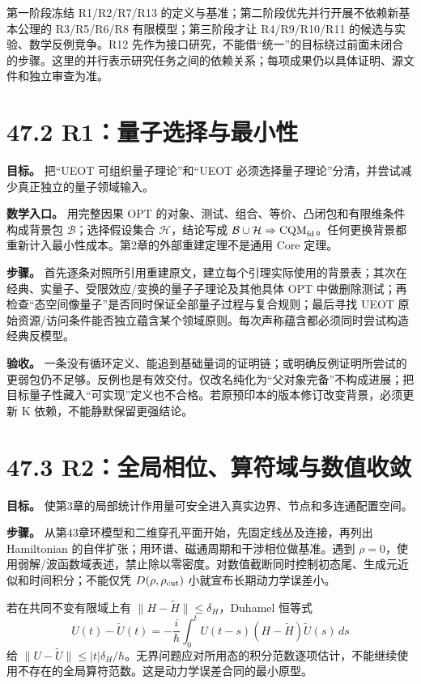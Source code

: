 \documentclass[
  11pt,
  oneside]{book}
\begin{document}
第一阶段冻结 R1/R2/R7/R13
的定义与基准；第二阶段优先并行开展不依赖新基本公理的 R3/R5/R6/R8
有限模型；第三阶段才让 R4/R9/R10/R11 的候选与实验、数学反例竞争。R12
先作为接口研究，不能借``统一''的目标绕过前面未闭合的步骤。这里的并行表示研究任务之间的依赖关系；每项成果仍以具体证明、源文件和独立审查为准。

\section{47.2 R1：量子选择与最小性}

\textbf{目标。} 把``UEOT 可组织量子理论''和``UEOT
必须选择量子理论''分清，并尝试减少真正独立的量子领域输入。

\textbf{数学入口。} 用完整因果 OPT
的对象、测试、组合、等价、凸闭包和有限维条件构成背景包
\(\mathcal B\)；选择假设集合 \(\mathcal H\)，结论写成
\(\mathcal B\cup\mathcal H\Rightarrow\mathrm{CQM}_{\rm fd}\)。任何更换背景都重新计入最小性成本。第2章的外部重建定理不是通用
Core 定理。

\textbf{步骤。}
首先逐条对照所引用重建原文，建立每个引理实际使用的背景表；其次在经典、实量子、受限效应/变换的量子子理论及其他具体
OPT
中做删除测试；再检查``态空间像量子''是否同时保证全部量子过程与复合规则；最后寻找
UEOT
原始资源/访问条件能否独立蕴含某个领域原则。每次声称蕴含都必须同时尝试构造经典反模型。

\textbf{验收。}
一条没有循环定义、能追到基础量词的证明链；或明确反例证明所尝试的更弱包仍不足够。反例也是有效交付。仅改名纯化为``父对象完备''不构成进展；把目标量子性藏入``可实现''定义也不合格。若原预印本的版本修订改变背景，必须更新
K 依赖，不能静默保留更强结论。

\section{47.3 R2：全局相位、算符域与数值收敛}

\textbf{目标。}
使第3章的局部统计作用量可安全进入真实边界、节点和多连通配置空间。

\textbf{步骤。}
从第43章环模型和二维穿孔平面开始，先固定线丛及连接，再列出 Hamiltonian
的自伴扩张；用环谱、磁通周期和干涉相位做基准。遇到
\(\rho=0\)，使用弱解/波函数域表述，禁止除以零密度。对数值截断同时控制初态尾、生成元近似和时间积分；不能仅凭
\(D(\rho,\rho_{\rm cut})\) 小就宣布长期动力学误差小。

若在共同不变有限域上有 \(\|H-\widetilde H\|\le\delta_H\)，Duhamel 恒等式
\[
U(t)-\widetilde U(t)
=-\frac{i}{\hbar}\int_0^tU(t-s)(H-\widetilde H)\widetilde U(s)\,ds
\] 给
\(\|U-\widetilde U\|\le |t|\delta_H/\hbar\)。无界问题应对所用态的积分范数逐项估计，不能继续使用不存在的全局算符范数。这是动力学误差合同的最小原型。
\end{document}
